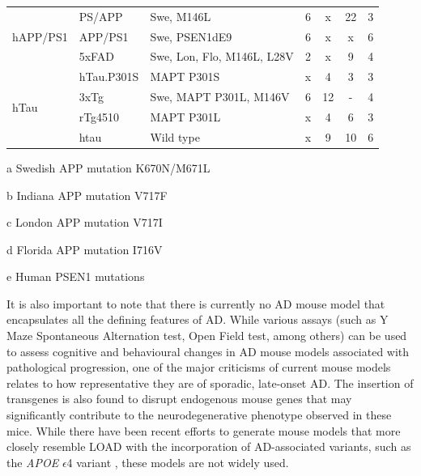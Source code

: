 \begin{table}[h]
\begin{threeparttable}
\begin{tabular}{@{}lllcccc@{}}
			\multirow{3}{*}{hAPP/PS1} & PS/APP & Swe\tnote{a}, M146L\tnote{e}                 & 6  & x  & 22    & 3                \\
			& APP/PS1         & Swe\tnote{a}, PSEN1dE9              & 6  & x  & x     & 6                \\
			& 5xFAD                 & Swe\tnote{a}, Lon\tnote{a}, Flo\tnote{c}, M146L\tnote{e}, L28V\tnote{e} & 2  & x  & 9     & 4                \\
			\multirow{4}{*}{hTau}     & hTau.P301S            & MAPT P301S                 & x  & 4  & 3     & 3                \\
			& 3xTg                  & Swe\tnote{a}, MAPT P301L, M146V     & 6  & 12 & -    & 4                \\
			& rTg4510               & MAPT P301L                 & x  & 4  & 6     & 3                \\
			& htau                  & Wild type                   & x  & 9  & 10    & 6                \\ \cmidrule(l){1-7} 
		\end{tabular}
		\begin{tablenotes}
			\footnotesize
			\item[a] Swedish APP mutation K670N/M671L
			\item[b] Indiana APP mutation V717F
			\item[c] London APP mutation V717I
			\item[d] Florida APP mutation I716V 
			\item[e] Human PSEN1 mutations 
		\end{tablenotes}
	\end{threeparttable}
\end{table}

It is also important to note that there is currently no AD mouse model that encapsulates all the defining features of AD. While various assays (such as Y Maze Spontaneous Alternation test, Open Field test, among others) can be used to assess cognitive and behavioural changes in AD mouse models associated with pathological progression\cite{Blackmore2017}, one of the major criticisms of current mouse models relates to how representative they are of sporadic, late-onset AD. The insertion of transgenes is also found to disrupt endogenous mouse genes that may significantly contribute to the neurodegenerative phenotype observed in these mice\cite{Gamache2019}. While there have been recent efforts to generate mouse models that more closely resemble LOAD with the incorporation of AD-associated variants, such as the \textit{APOE} $\epsilon$4 variant \cite{apoe4trem2_mousemodel,Lewandowski2020}, these models are not widely used. 

